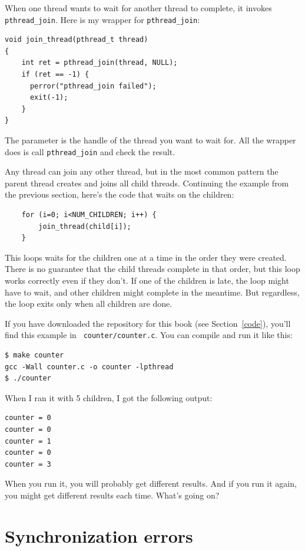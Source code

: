\documentclass[12pt]{book}
\begin{document}
When one thread wants to wait for another thread to complete,
it invokes {\tt pthread\_join}.
Here is my wrapper for {\tt pthread\_join}:

\begin{verbatim}
void join_thread(pthread_t thread)
{
    int ret = pthread_join(thread, NULL);
    if (ret == -1) {
      perror("pthread_join failed");
      exit(-1);
    }
}
\end{verbatim}

The parameter is the handle of the thread you want to wait for.
All the wrapper does is call {\tt pthread\_join} and check the
result.

Any thread can join any other thread, but in the most common pattern
the parent thread creates and joins all child threads.
Continuing the example from the previous section, here's the
code that waits on the children:

\begin{verbatim}
    for (i=0; i<NUM_CHILDREN; i++) {
        join_thread(child[i]);
    }
\end{verbatim}

This loops waits for the children one at a time in the order they
were created.  There is no guarantee that the child threads complete 
in that order, but this loop works correctly even if they don't.  If one
of the children is late, the loop might have to wait, and other children
might complete in the meantime.  But regardless, the loop exits
only when all children are done.

If you have downloaded the repository for this book (see
Section~\ref{code}), you'll find this example in {\tt
  counter/counter.c}.  You can compile and run it like this:

\begin{verbatim}
$ make counter
gcc -Wall counter.c -o counter -lpthread
$ ./counter
\end{verbatim}

When I ran it with 5 children, I got the following output:

\begin{verbatim}
counter = 0
counter = 0
counter = 1
counter = 0
counter = 3
\end{verbatim}

When you run it, you will probably get different results.  And if
you run it again, you might get different results each time.  What's
going on?


\section{Synchronization errors}
\end{document}
